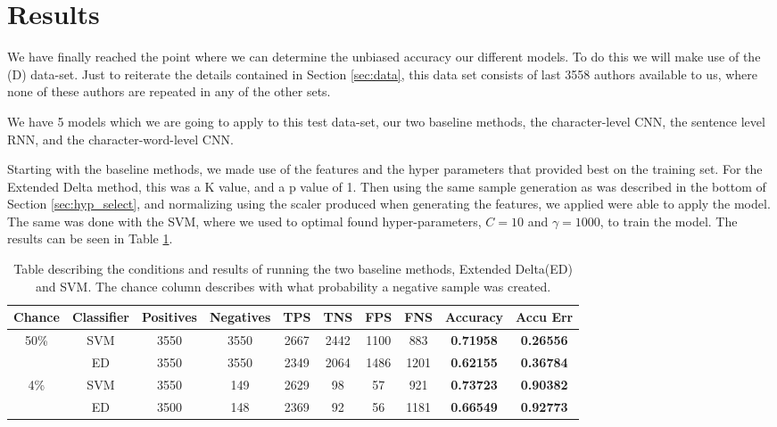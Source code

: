 \section{Results} \label{sec:results}

We have finally reached the point where we can determine the unbiased accuracy
our different models. To do this we will make use of the (D) data-set. Just
to reiterate the details contained in Section \ref{sec:data}, this data set
consists of last 3558 authors available to us, where none of these authors are
repeated in any of the other sets.

We have 5 models which we are going to apply to this test data-set,
our two baseline methods, the character-level \gls{CNN}, the sentence
level RNN, and the character-word-level \gls{CNN}.

Starting with the baseline methods, we made use of the features and the
hyper parameters that provided best on the training set.
For the Extended Delta method, this was a K value, and a p value of 1.
Then using the same sample generation as was described in the bottom
of Section \ref{sec:hyp_select}, and normalizing using the scaler
produced when generating the features, we applied were able to apply the model.
The same was done with the SVM, where we used to optimal found hyper-parameters,
$C=10$ and $\gamma = 1000$, to train the model. The results can be seen in Table
\ref{tab:baseline-res}.



\begin{table}
\centering
\begin{tabular}{|c|c|c|c|c|c|c|c||c|c|}
\hline
Chance & Classifier & Positives & Negatives & TPS & TNS & FPS & FNS & \textbf{Accuracy} & \textbf{Accu Err} \\ \hline
\multirow{2}{*}{50\%} & SVM & 3550 & 3550 & 2667 & 2442 & 1100 & 883 & \textbf{0.71958} & \textbf{0.26556} \\ \cline{2-10} 
 & ED & 3550 & 3550 & 2349 & 2064 & 1486 & 1201 & \textbf{0.62155} & \textbf{0.36784} \\ \hline
\multirow{2}{*}{4\%} & SVM & 3550 & 149 & 2629 & 98 & 57 & 921 & \textbf{0.73723} & \textbf{0.90382} \\ \cline{2-10} 
 & ED & 3500 & 148 & 2369 & 92 & 56 & 1181 & \textbf{0.66549} & \textbf{0.92773} \\ \hline
\end{tabular}
\caption{Table describing the conditions and results of running the two baseline methods,
Extended Delta(ED) and SVM. The chance column describes with what probability a negative sample was
created.}
\label{tab:baseline-res}
\end{table}
